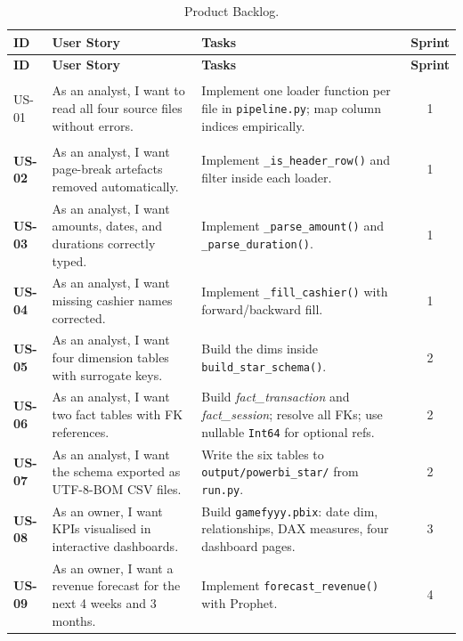 \documentclass[12pt, a4paper]{report}
\begin{document}
\begin{longtable}{>{\bfseries}p{1.3cm} p{4.6cm} p{6.6cm} c}
  \caption{Product Backlog.\label{tab:backlog}} \\
  \toprule
  \textbf{ID} & \textbf{User Story} & \textbf{Tasks} & \textbf{Sprint} \\
  \midrule
  \endfirsthead
  \toprule
  \textbf{ID} & \textbf{User Story} & \textbf{Tasks} & \textbf{Sprint} \\
  \midrule
  \endhead
  \bottomrule
  \endfoot

  US-01 & As an analyst, I want to read all four source files without errors.
        & Implement one loader function per file in \texttt{pipeline.py};
          map column indices empirically.
        & 1 \\[3pt]
  US-02 & As an analyst, I want page-break artefacts removed automatically.
        & Implement \texttt{\_is\_header\_row()} and filter inside each loader.
        & 1 \\[3pt]
  US-03 & As an analyst, I want amounts, dates, and durations correctly typed.
        & Implement \texttt{\_parse\_amount()} and \texttt{\_parse\_duration()}.
        & 1 \\[3pt]
  US-04 & As an analyst, I want missing cashier names corrected.
        & Implement \texttt{\_fill\_cashier()} with forward/backward fill.
        & 1 \\[3pt]
  US-05 & As an analyst, I want four dimension tables with surrogate keys.
        & Build the dims inside \texttt{build\_star\_schema()}.
        & 2 \\[3pt]
  US-06 & As an analyst, I want two fact tables with FK references.
        & Build \textit{fact\_transaction} and \textit{fact\_session};
          resolve all FKs; use nullable \texttt{Int64} for optional refs.
        & 2 \\[3pt]
  US-07 & As an analyst, I want the schema exported as UTF-8-BOM CSV files.
        & Write the six tables to \texttt{output/powerbi\_star/} from
          \texttt{run.py}.
        & 2 \\[3pt]
  US-08 & As an owner, I want KPIs visualised in interactive dashboards.
        & Build \texttt{gamefyyy.pbix}: date dim, relationships, DAX measures,
          four dashboard pages.
        & 3 \\[3pt]
  US-09 & As an owner, I want a revenue forecast for the next 4 weeks and 3 months.
        & Implement \texttt{forecast\_revenue()} with Prophet.
        & 4 \\[3pt]

\end{longtable}
\end{document}
